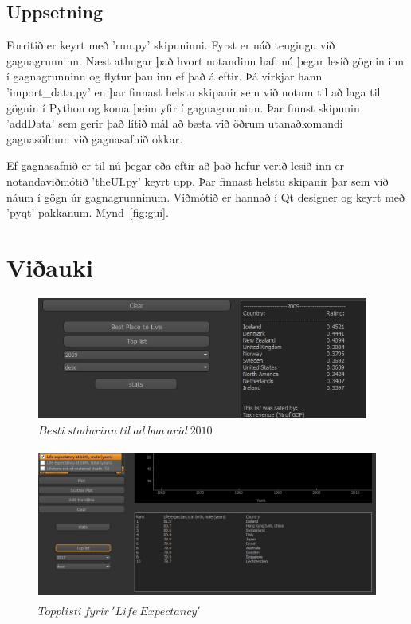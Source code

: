 \documentclass[paper=a4, fontsize=11pt]{scrartcl}
\begin{document}
\subsection{Uppsetning}
Forritið er keyrt með 'run.py' skipuninni. Fyrst er náð tengingu við gagnagrunninn. Næst athugar það hvort notandinn hafi nú þegar lesið gögnin inn í gagnagrunninn og flytur þau inn ef það á eftir. Þá virkjar hann 'import\_data.py' en þar finnast helstu skipanir sem við notum til að laga til gögnin í Python og koma þeim yfir í gagnagrunninn. Þar finnst skipunin 'addData' sem gerir það lítið mál að bæta við öðrum utanaðkomandi gagnasöfnum við gagnasafnið okkar.\par
Ef gagnasafnið er til nú þegar eða eftir að það hefur verið lesið inn er notandaviðmótið 'theUI.py' keyrt upp. Þar finnast helstu skipanir þar sem við náum í gögn úr gagnagrunninum. Viðmótið er hannað í Qt designer og keyrt með 'pyqt' pakkanum. Mynd~\ref{fig:gui}.

\newpage

\section{Viðauki}
\begin{figure}[H]
\begin{center}
\includegraphics[height=40mm]{images/best.jpg}
\caption{$ Besti\ stadurinn\ til\ ad\ bua\ arid\ 2010 $\label{fig:best}}
\end{center}
\end{figure}

\begin{figure}[H]
\begin{center}
\includegraphics[height=50mm]{images/topList_life.jpg}
\caption{$ Topplisti\ fyrir\ 'Life\ Expectancy' $\label{fig:topp}}
\end{center}
\end{figure}
\end{document}
